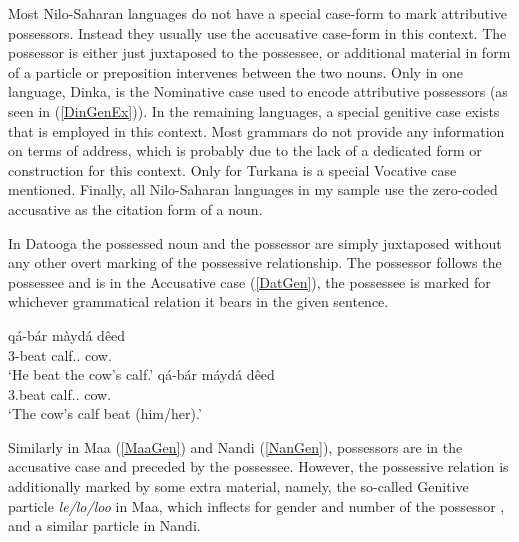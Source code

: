 Most Nilo-Saharan languages do not have a special case-form to mark attributive possessors.
Instead they usually use the accusative case-form in this context. 
The possessor is either just juxtaposed to the possessee, or additional material in form of a particle or preposition intervenes between the two nouns. 
Only in one language, Dinka, is the Nominative case used to encode attributive possessors (as seen in (\ref{DinGenEx})). 
In the remaining languages, a special genitive case exists that is employed in this context.
Most grammars do not provide any information on terms of address, which is probably due to the lack of a dedicated form or construction for this context.
Only for Turkana is a special Vocative case mentioned. 
Finally, all Nilo-Saharan languages in my sample use the zero-coded accusative as the citation form of a noun.



In Datooga the possessed noun and the possessor are simply juxtaposed without any other overt marking of the possessive relationship. 
The possessor follows the possessee and is in the Accusative case (\ref{DatGen}), the possessee is marked for whichever grammatical relation it bears in the given sentence.

\begin{exe}\ex\label{DatGen}
\begin{xlist}
\ex\gll q\'a-b\'ar m\`ayd\'a d\^eed\\
3\sg{}-beat calf.\acc{}.\cs{} cow.\acc{}\\
\glt `He beat the cow's calf.'
\ex\gll q\'a-b\'ar m\'ayd\'a d\^eed\\
3\sg{}.beat calf.\nom{}.\cs{} cow.\acc{}\\
\glt `The cow's calf beat (him/her).'
\end{xlist}
\end{exe}

Similarly in Maa (\ref{MaaGen}) and Nandi (\ref{NanGen}), possessors are in the accusative case and preceded by the possessee. 
However, the possessive relation is additionally marked by some extra material, namely, the so-called Genitive particle \emph{le/lo/loo} in Maa, which inflects for gender and number of the possessor , and a similar particle \emph{} in Nandi. 

